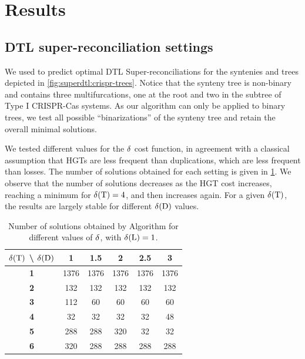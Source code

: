 \section{Results}\label{sec:superdtl:results}

\subsection{DTL super-reconciliation settings}

We used {\superdtl} to predict optimal DTL Super-reconciliations for the syntenies and trees depicted in \cref{fig:superdtl:crispr-trees}.
Notice that the synteny tree is non-binary and contains three multifurcations, one at the root and two in the subtree of Type I CRISPR-Cas systems.
As our algorithm can only be applied to binary trees, we test all possible \enquote{binarizations} of the synteny tree and retain the overall minimal solutions.

We tested different values for the \(\delta\kern.1pt\) cost function, in agreement with a classical assumption that HGTs are less frequent than duplications, which are less frequent than losses.
The number of solutions obtained for each setting is given in \cref{tab:superdtl:sol-count}. We observe that the number of solutions decreases as the HGT cost increases, reaching a minimum for \(\delta\kern.1pt(\mathrm{T}) = 4\), and then increases again. For a given \(\delta\kern.1pt(\mathrm{T})\), the results are largely stable for different \(\delta\kern.1pt(\mathrm{D})\) values.

\begin{table}[h]
    \capstart
    \centering
    \setlength{\tabcolsep}{8pt}
    \begin{tabular}{cccccc}
        \toprule
        \textbf{\(\delta\kern.1pt(\mathrm{T})\) \textbackslash{} \(\delta\kern.1pt(\mathrm{D})\)} &
        \textbf{1} & \textbf{1.5} & \textbf{2} & \textbf{2.5} & \textbf{3}\\
        \midrule
        \textbf{1} & 1376 & 1376 & 1376 & 1376 & 1376 \\ \midrule
        \textbf{2} & 132 & 132 & 132 & 132 & 132 \\ \midrule
        \textbf{3} & 112 & 60 & 60 & 60 & 60 \\ \midrule
        \textbf{4} & 32 & 32 & 32 & 32 & 48 \\ \midrule
        \textbf{5} & 288 & 288 & 320 & 32 & 32 \\ \midrule
        \textbf{6} & 320 & 288 & 288 & 288 & 288 \\
        \bottomrule
    \end{tabular}
    \caption[Number of SuperDTL solutions for various cost settings]{
        Number of solutions obtained by Algorithm {\superdtl} for different values of \(\delta\kern.1pt\), with \(\delta\kern.1pt(\mathrm{L}) = 1\).
        \label{tab:superdtl:sol-count}
    }
\end{table}

